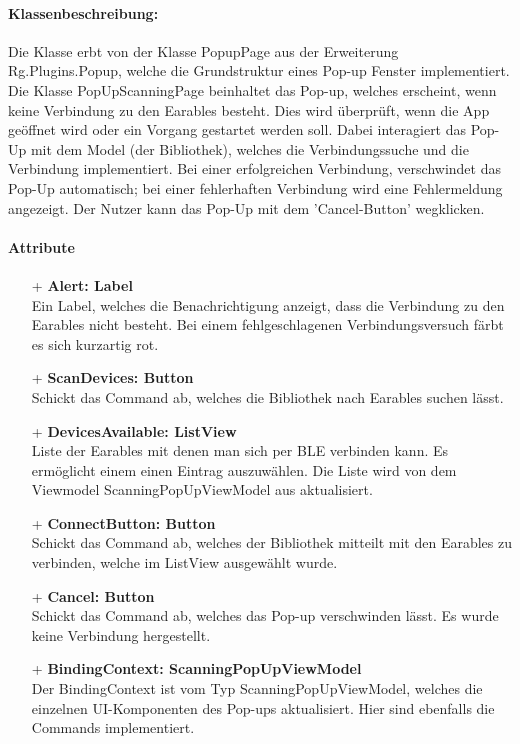 \documentclass[a4paper,12pt]{article}
\begin{document}
		\paragraph{Klassenbeschreibung:}
		Die Klasse erbt von der Klasse PopupPage aus der Erweiterung \Gls{Rg.Plugins.Popup}, welche die Grundstruktur eines Pop-up Fenster implementiert.\\
		Die Klasse PopUpScanningPage beinhaltet das Pop-up, welches erscheint, wenn keine Verbindung zu den \gls{Earables} besteht. Dies wird überprüft, wenn die App geöffnet wird oder ein Vorgang gestartet werden soll. Dabei interagiert das Pop-Up mit dem Model (der Bibliothek), welches die Verbindungssuche und die Verbindung implementiert. Bei einer erfolgreichen Verbindung, verschwindet das Pop-Up automatisch; bei einer fehlerhaften Verbindung wird eine Fehlermeldung angezeigt. Der Nutzer kann das Pop-Up mit dem 'Cancel-Button' wegklicken. 
		\paragraph{Attribute}
		\begin{itemize}
		\item[+] \textbf{Alert: Label}\\Ein Label, welches die Benachrichtigung anzeigt, dass die Verbindung zu den \gls{Earables} nicht besteht. Bei einem fehlgeschlagenen Verbindungsversuch färbt es sich kurzartig rot.
		\item[+] \textbf{ScanDevices: Button}\\Schickt das Command ab, welches die Bibliothek nach \gls{Earables} suchen lässt.
		\item[+] \textbf{DevicesAvailable: ListView}\\Liste der \Gls{Earables} mit denen man sich per \gls{BLE} verbinden kann. Es ermöglicht einem einen Eintrag auszuwählen. Die Liste wird von dem Viewmodel ScanningPopUpViewModel aus aktualisiert.
		\item[+] \textbf{ConnectButton: Button}\\Schickt das Command ab, welches der Bibliothek mitteilt mit den \Gls{Earables} zu verbinden, welche im ListView ausgewählt wurde.
		\item[+] \textbf{Cancel: Button}\\Schickt das Command ab, welches das Pop-up verschwinden lässt. Es wurde keine Verbindung hergestellt.
		\item[+] \textbf{BindingContext: ScanningPopUpViewModel}\\Der BindingContext ist vom Typ ScanningPopUpViewModel, welches die einzelnen UI-Komponenten des Pop-ups aktualisiert. Hier sind ebenfalls die Commands implementiert.
		\end{itemize}
		
\end{document}
